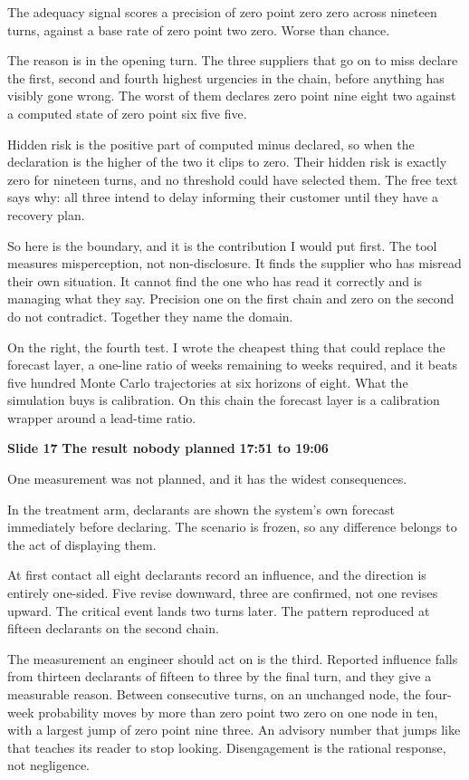 \documentclass[a4paper,12pt]{article}
\newcommand{\SlideHeading}[3]{%
  \needspace{4\baselineskip}%
  \vspace{10pt}%
  \noindent\colorbox{altenBlueBg}{%
    \parbox{\dimexpr\linewidth-2\fboxsep}{%
      \vspace{3pt}%
      \textbf{\large\color{altenNavy}#1}\quad
      \textbf{\large\color{altenAzureDark}#2}%
      \hfill\textbf{\color{altenAzure}#3}%
      \vspace{3pt}}}%
  \vspace{5pt}\par}
\begin{document}
The adequacy signal scores a precision of zero point zero zero across nineteen turns, against a base rate of zero point two zero. Worse than chance.

The reason is in the opening turn. The three suppliers that go on to miss declare the first, second and fourth highest urgencies in the chain, before anything has visibly gone wrong. The worst of them declares zero point nine eight two against a computed state of zero point six five five.

Hidden risk is the positive part of computed minus declared, so when the declaration is the higher of the two it clips to zero. Their hidden risk is exactly zero for nineteen turns, and no threshold could have selected them. The free text says why: all three intend to delay informing their customer until they have a recovery plan.

So here is the boundary, and it is the contribution I would put first. The tool measures misperception, not non-disclosure. It finds the supplier who has misread their own situation. It cannot find the one who has read it correctly and is managing what they say. Precision one on the first chain and zero on the second do not contradict. Together they name the domain.

On the right, the fourth test. I wrote the cheapest thing that could replace the forecast layer, a one-line ratio of weeks remaining to weeks required, and it beats five hundred Monte Carlo trajectories at six horizons of eight. What the simulation buys is calibration. On this chain the forecast layer is a calibration wrapper around a lead-time ratio.

\SlideHeading{Slide 17}{The result nobody planned}{17:51 to 19:06}
One measurement was not planned, and it has the widest consequences.

In the treatment arm, declarants are shown the system's own forecast immediately before declaring. The scenario is frozen, so any difference belongs to the act of displaying them.

At first contact all eight declarants record an influence, and the direction is entirely one-sided. Five revise downward, three are confirmed, not one revises upward. The critical event lands two turns later. The pattern reproduced at fifteen declarants on the second chain.

The measurement an engineer should act on is the third. Reported influence falls from thirteen declarants of fifteen to three by the final turn, and they give a measurable reason. Between consecutive turns, on an unchanged node, the four-week probability moves by more than zero point two zero on one node in ten, with a largest jump of zero point nine three. An advisory number that jumps like that teaches its reader to stop looking. Disengagement is the rational response, not negligence.
\end{document}
